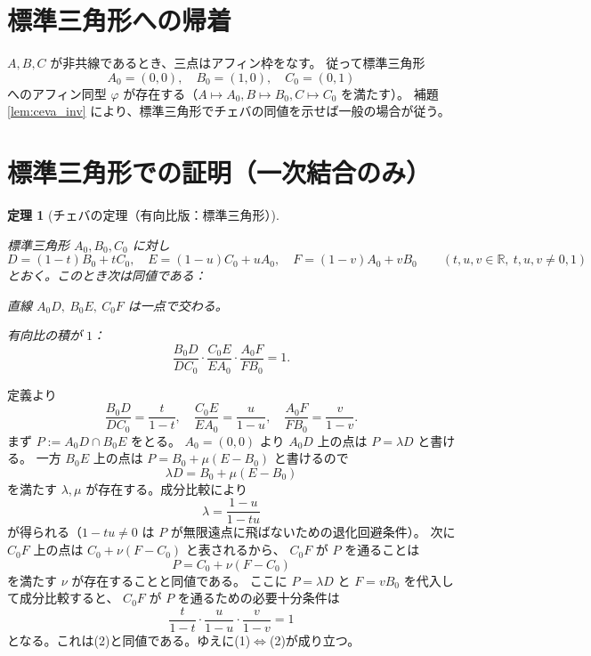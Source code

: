 \documentclass[a4paper,12pt]{bxjsbook}
\makeatletter
\newlength{\customindent}
\newenvironment{body}{
  \par
  \begingroup
  \setlength{\leftskip}{\customindent}
  \setlength{\rightskip}{0pt}
  \setlength{\parindent}{1em}
  \setlength{\displayindent}{\customindent}
  \setlength{\displaywidth}{\dimexpr\linewidth-\customindent\relax}
}{
  \par
  \endgroup
}
\theoremstyle{theorem}
\newtheorem{theorem}{定理}[chapter]
\renewenvironment{proof}[1][\proofname]{%
  \par\pushQED{\qed}%
  \normalfont
  \topsep6\p@\@plus6\p@\relax
  \list{}{%
    \leftmargin=\customindent
    \rightmargin=0pt
    \labelwidth=0pt
    \labelsep=0pt
    \itemindent=0pt
    \listparindent=0pt
    \parsep=0pt
  }%
  \item[\itshape #1\@addpunct{.}\hspace{0.5em}]%
  \setlength{\displayindent}{\customindent}%
  \setlength{\displaywidth}{\dimexpr\linewidth-\customindent\relax}%
  \ignorespaces
}{%
  \popQED\endlist\@endpefalse
}
\makeatother
\begin{document}
    \section{標準三角形への帰着}
    \begin{body}
        $A,B,C$ が非共線であるとき、三点はアフィン枠をなす。
        従って標準三角形
        \[
            A_0=(0,0),\quad B_0=(1,0),\quad C_0=(0,1)
        \]
        へのアフィン同型 $\varphi$ が存在する（$A\mapsto A_0,B\mapsto B_0,C\mapsto C_0$ を満たす）。
        補題 \ref{lem:ceva_inv} により、標準三角形でチェバの同値を示せば一般の場合が従う。
    \end{body}

    \section{標準三角形での証明（一次結合のみ）}
    \begin{theorem}[チェバの定理（有向比版：標準三角形）]\label{thm:ceva_std}
        \begin{body}
            標準三角形 $A_0,B_0,C_0$ に対し
            \[
                D=(1-t)B_0+tC_0,\quad E=(1-u)C_0+uA_0,\quad F=(1-v)A_0+vB_0 \qquad (t,u,v\in\mathbb{R},\ t,u,v\neq 0,1)
            \]
            とおく。このとき次は同値である：
            \begin{bodyenumerate}
                \item 直線 $A_0D,\ B_0E,\ C_0F$ は一点で交わる。
                \item 有向比の積が $1$：
                \[
                    \frac{B_0D}{DC_0}\cdot\frac{C_0E}{EA_0}\cdot\frac{A_0F}{FB_0}=1.
                \]
            \end{bodyenumerate}
        \end{body}
    \end{theorem}
    \begin{proof}
        \begin{body}
            定義より
            \[
                \frac{B_0D}{DC_0}=\frac{t}{1-t},\quad \frac{C_0E}{EA_0}=\frac{u}{1-u},\quad \frac{A_0F}{FB_0}=\frac{v}{1-v}.
            \]
            まず $P:=A_0D\cap B_0E$ をとる。
            $A_0=(0,0)$ より $A_0D$ 上の点は $P=\lambda D$ と書ける。
            一方 $B_0E$ 上の点は $P=B_0+\mu(E-B_0)$ と書けるので
            \[
                \lambda D = B_0+\mu(E-B_0)
            \]
            を満たす $\lambda,\mu$ が存在する。成分比較により
            \[
                \lambda=\frac{1-u}{1-tu}
            \]
            が得られる（$1-tu\neq 0$ は $P$ が無限遠点に飛ばないための退化回避条件）。
            次に $C_0F$ 上の点は $C_0+\nu(F-C_0)$ と表されるから、
            $C_0F$ が $P$ を通ることは
            \[
                P=C_0+\nu(F-C_0)
            \]
            を満たす $\nu$ が存在することと同値である。
            ここに $P=\lambda D$ と $F=vB_0$ を代入して成分比較すると、
            $C_0F$ が $P$ を通るための必要十分条件は
            \[
                \frac{t}{1-t}\cdot\frac{u}{1-u}\cdot\frac{v}{1-v}=1
            \]
            となる。これは(2)と同値である。ゆえに(1)$\Leftrightarrow$(2)が成り立つ。
        \end{body}
    \end{proof}
\end{document}
